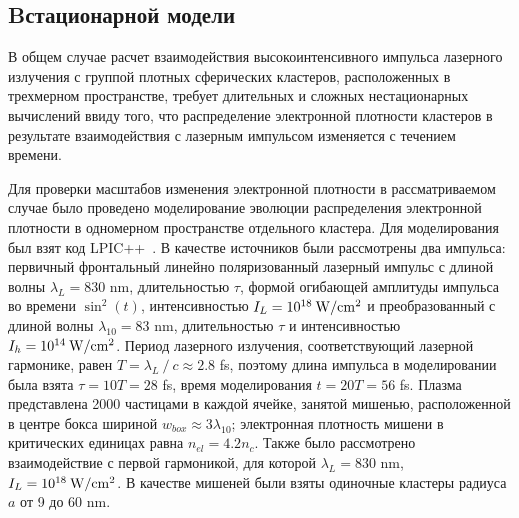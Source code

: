 \subsection*{B стационарной модели}

В общем случае расчет взаимодействия высокоинтенсивного импульса лазерного излучения с группой плотных сферических кластеров, расположенных в трехмерном пространстве, требует длительных и сложных нестационарных вычислений ввиду того, что распределение электронной плотности кластеров в результате взаимодействия с лазерным импульсом изменяется с течением времени.

Для проверки масштабов изменения электронной плотности в рассматриваемом случае было проведено моделирование эволюции распределения электронной плотности в одномерном пространстве отдельного кластера. Для моделирования был взят код LPIC++~\cite{Pfund1998}. В качестве источников были рассмотрены два импульса: первичный фронтальный линейно поляризованный лазерный импульс с длиной волны $\lambda_{L} = 830$ nm, длительностью $\tau$, формой огибающей амплитуды импульса во времени $\sin^2{(t)}$, интенсивностью $I_{L} = 10^{18}\:\rm{W}/\rm{cm}^2$ и преобразованный с длиной волны $\lambda_{10} = 83$ nm, длительностью $\tau$ и интенсивностью $I_{h} = 10^{14}\:\rm{W}/\rm{cm}^2$. Период лазерного излучения, соответствующий лазерной гармонике, равен $T = \lambda_{L}\:/\:c \approx 2.8$ fs, поэтому длина импульса в моделировании была взята $\tau = 10T = 28$ fs, время моделирования $t = 20T = 56$ fs. Плазма представлена 2000 частицами в каждой ячейке, занятой мишенью, расположенной в центре бокса шириной $w_{box} \approx 3\lambda_{10}$; электронная плотность мишени в критических единицах равна $n_{el} = 4.2 n_c$. Также было рассмотрено взаимодействие с первой гармоникой, для которой $\lambda_L = 830$ nm, $I_L = 10^{18}\:\rm{W}/\rm{cm}^2$. В качестве мишеней были взяты одиночные кластеры радиуса $a$ от 9 до 60 nm.




